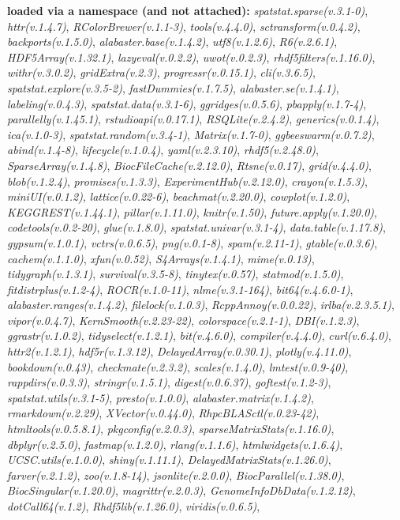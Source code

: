\documentclass[
]{book}
\begin{document}
\textbf{loaded via a namespace (and not attached):}
\emph{spatstat.sparse(v.3.1-0)}, \emph{httr(v.1.4.7)}, \emph{RColorBrewer(v.1.1-3)}, \emph{tools(v.4.4.0)}, \emph{sctransform(v.0.4.2)}, \emph{backports(v.1.5.0)}, \emph{alabaster.base(v.1.4.2)}, \emph{utf8(v.1.2.6)}, \emph{R6(v.2.6.1)}, \emph{HDF5Array(v.1.32.1)}, \emph{lazyeval(v.0.2.2)}, \emph{uwot(v.0.2.3)}, \emph{rhdf5filters(v.1.16.0)}, \emph{withr(v.3.0.2)}, \emph{gridExtra(v.2.3)}, \emph{progressr(v.0.15.1)}, \emph{cli(v.3.6.5)}, \emph{spatstat.explore(v.3.5-2)}, \emph{fastDummies(v.1.7.5)}, \emph{alabaster.se(v.1.4.1)}, \emph{labeling(v.0.4.3)}, \emph{spatstat.data(v.3.1-6)}, \emph{ggridges(v.0.5.6)}, \emph{pbapply(v.1.7-4)}, \emph{parallelly(v.1.45.1)}, \emph{rstudioapi(v.0.17.1)}, \emph{RSQLite(v.2.4.2)}, \emph{generics(v.0.1.4)}, \emph{ica(v.1.0-3)}, \emph{spatstat.random(v.3.4-1)}, \emph{Matrix(v.1.7-0)}, \emph{ggbeeswarm(v.0.7.2)}, \emph{abind(v.1.4-8)}, \emph{lifecycle(v.1.0.4)}, \emph{yaml(v.2.3.10)}, \emph{rhdf5(v.2.48.0)}, \emph{SparseArray(v.1.4.8)}, \emph{BiocFileCache(v.2.12.0)}, \emph{Rtsne(v.0.17)}, \emph{grid(v.4.4.0)}, \emph{blob(v.1.2.4)}, \emph{promises(v.1.3.3)}, \emph{ExperimentHub(v.2.12.0)}, \emph{crayon(v.1.5.3)}, \emph{miniUI(v.0.1.2)}, \emph{lattice(v.0.22-6)}, \emph{beachmat(v.2.20.0)}, \emph{cowplot(v.1.2.0)}, \emph{KEGGREST(v.1.44.1)}, \emph{pillar(v.1.11.0)}, \emph{knitr(v.1.50)}, \emph{future.apply(v.1.20.0)}, \emph{codetools(v.0.2-20)}, \emph{glue(v.1.8.0)}, \emph{spatstat.univar(v.3.1-4)}, \emph{data.table(v.1.17.8)}, \emph{gypsum(v.1.0.1)}, \emph{vctrs(v.0.6.5)}, \emph{png(v.0.1-8)}, \emph{spam(v.2.11-1)}, \emph{gtable(v.0.3.6)}, \emph{cachem(v.1.1.0)}, \emph{xfun(v.0.52)}, \emph{S4Arrays(v.1.4.1)}, \emph{mime(v.0.13)}, \emph{tidygraph(v.1.3.1)}, \emph{survival(v.3.5-8)}, \emph{tinytex(v.0.57)}, \emph{statmod(v.1.5.0)}, \emph{fitdistrplus(v.1.2-4)}, \emph{ROCR(v.1.0-11)}, \emph{nlme(v.3.1-164)}, \emph{bit64(v.4.6.0-1)}, \emph{alabaster.ranges(v.1.4.2)}, \emph{filelock(v.1.0.3)}, \emph{RcppAnnoy(v.0.0.22)}, \emph{irlba(v.2.3.5.1)}, \emph{vipor(v.0.4.7)}, \emph{KernSmooth(v.2.23-22)}, \emph{colorspace(v.2.1-1)}, \emph{DBI(v.1.2.3)}, \emph{ggrastr(v.1.0.2)}, \emph{tidyselect(v.1.2.1)}, \emph{bit(v.4.6.0)}, \emph{compiler(v.4.4.0)}, \emph{curl(v.6.4.0)}, \emph{httr2(v.1.2.1)}, \emph{hdf5r(v.1.3.12)}, \emph{DelayedArray(v.0.30.1)}, \emph{plotly(v.4.11.0)}, \emph{bookdown(v.0.43)}, \emph{checkmate(v.2.3.2)}, \emph{scales(v.1.4.0)}, \emph{lmtest(v.0.9-40)}, \emph{rappdirs(v.0.3.3)}, \emph{stringr(v.1.5.1)}, \emph{digest(v.0.6.37)}, \emph{goftest(v.1.2-3)}, \emph{spatstat.utils(v.3.1-5)}, \emph{presto(v.1.0.0)}, \emph{alabaster.matrix(v.1.4.2)}, \emph{rmarkdown(v.2.29)}, \emph{XVector(v.0.44.0)}, \emph{RhpcBLASctl(v.0.23-42)}, \emph{htmltools(v.0.5.8.1)}, \emph{pkgconfig(v.2.0.3)}, \emph{sparseMatrixStats(v.1.16.0)}, \emph{dbplyr(v.2.5.0)}, \emph{fastmap(v.1.2.0)}, \emph{rlang(v.1.1.6)}, \emph{htmlwidgets(v.1.6.4)}, \emph{UCSC.utils(v.1.0.0)}, \emph{shiny(v.1.11.1)}, \emph{DelayedMatrixStats(v.1.26.0)}, \emph{farver(v.2.1.2)}, \emph{zoo(v.1.8-14)}, \emph{jsonlite(v.2.0.0)}, \emph{BiocParallel(v.1.38.0)}, \emph{BiocSingular(v.1.20.0)}, \emph{magrittr(v.2.0.3)}, \emph{GenomeInfoDbData(v.1.2.12)}, \emph{dotCall64(v.1.2)}, \emph{Rhdf5lib(v.1.26.0)}, \emph{viridis(v.0.6.5)}, 
\end{document}
